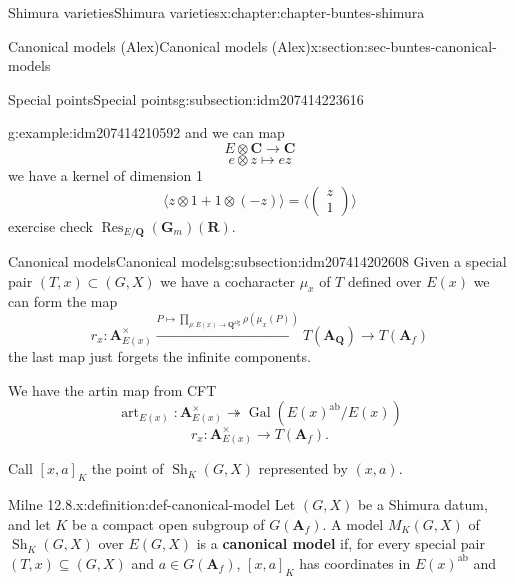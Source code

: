 \documentclass[oneside,10pt,]{book}
\newcommand{\terminology}[1]{\textbf{#1}}
\numberwithin{equation}{section}
\newcommand{\lb}{[}
\newcommand{\rb}{]}
\newcommand{\QQ}{\mathbf{Q}}
\newcommand{\RR}{\mathbf{R}}
\newcommand{\CC}{\mathbf{C}}
\newcommand{\adeles}{\mathbf{A}}
\newcommand{\alg}{\mathrm{alg}}
\newcommand{\ab}{\mathrm{ab}}
\newcommand{\Gal}[2]{\operatorname{Gal}(#1/#2)}
\DeclareMathOperator{\Res}{Res}
\begin{document}
\begin{chapterptx}{Shimura varieties}{}{Shimura varieties}{}{}{x:chapter:chapter-buntes-shimura}
\begin{sectionptx}{Canonical models (Alex)}{}{Canonical models (Alex)}{}{}{x:section:sec-buntes-canonical-models}
\begin{subsectionptx}{Special points}{}{Special points}{}{}{g:subsection:idm207414223616}
\begin{example}{}{g:example:idm207414210592}
and we can map%
\begin{equation*}
E\otimes \CC \to \CC
\end{equation*}
%
\begin{equation*}
e\otimes z \mapsto ez
\end{equation*}
we have a kernel of dimension 1%
\begin{equation*}
\langle z \otimes 1 + 1\otimes (-z) \rangle = \langle \begin{pmatrix} z \\ 1 \end{pmatrix}\rangle
\end{equation*}
exercise check \(\Res_{E/\QQ}(\mathbf G_m)(\RR)\).%
\end{example}
\end{subsectionptx}
%
%
\typeout{************************************************}
\typeout{************************************************}
%
\begin{subsectionptx}{Canonical models}{}{Canonical models}{}{}{g:subsection:idm207414202608}
Given a special pair \((T,x) \subset (G,X)\) we have a cocharacter \(\mu_x\) of \(T\) defined over \(E(x)\) we can form the map%
\begin{equation*}
r_x \colon \adeles^\times_{E(x)} \xrightarrow{ P \mapsto \prod_{\rho \colon E(x) \to \QQ^\alg} \rho(\mu_x(P)) } T(\adeles_\QQ) \to T(\adeles_f)
\end{equation*}
the last map just forgets the infinite components.%
\par
We have the artin map from CFT%
\begin{equation*}
{\operatorname{art}}_{E(x)} \colon \adeles^\times_{E(x)} \twoheadrightarrow \Gal{E(x)^\ab}{E(x)}
\end{equation*}
%
\begin{equation*}
r_x \colon \adeles^\times_{E(x)} \to T(\adeles_f)\text{.}
\end{equation*}
%
\par
Call \(\lb x,a\rb_K\) the point of \({\operatorname{Sh}}_K(G,X)\) represented by \((x,a)\).%
\begin{definition}{Milne 12.8.}{x:definition:def-canonical-model}%
Let \((G,X)\) be a Shimura datum, and let \(K\) be a compact open subgroup of \(G(\adeles_f)\). A model \(M_K(G,X)\) of \({\operatorname{Sh}}_K(G,X)\) over \(E(G,X)\) is a \terminology{canonical model} if, for every special pair \((T, x) \subseteq (G,X)\) and \(a \in G(\adeles_f)\), \(\lb x,a\rb _K\) has coordinates in \(E(x)^\ab\) and%

\end{definition}
\end{subsectionptx}
\end{sectionptx}
\end{chapterptx}
\end{document}

